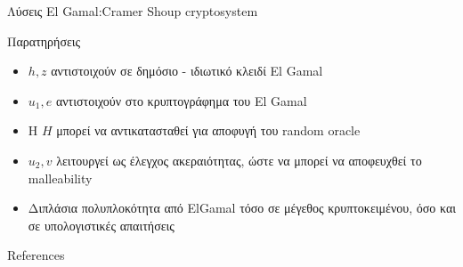 \documentclass{beamer}
\begin{document}
\begin{frame}[allowframebreaks]{Λύσεις El Gamal:Cramer Shoup cryptosystem \cite{cs98}}
\begin{block}{Παρατηρήσεις}
\begin{itemize}
\item $h,z$ αντιστοιχούν σε δημόσιο - ιδιωτικό κλειδί  El Gamal
\item $u_1, e$ αντιστοιχούν στο κρυπτογράφημα του El Gamal
\item H $H$ μπορεί να αντικατασταθεί για αποφυγή του random oracle
\item $u_2,v$ λειτουργεί ως έλεγχος ακεραιότητας, ώστε να  μπορεί να αποφευχθεί το malleability 
\item Διπλάσια πολυπλοκότητα από ElGamal τόσο σε μέγεθος κρυπτοκειμένου, όσο και σε υπολογιστικές απαιτήσεις
\end{itemize}
\end{block}
\end{frame}

\begin{frame}[allowframebreaks]{References}
\begin{small}
\nocite{*}


\end{small}
\end{frame}
\end{document}
